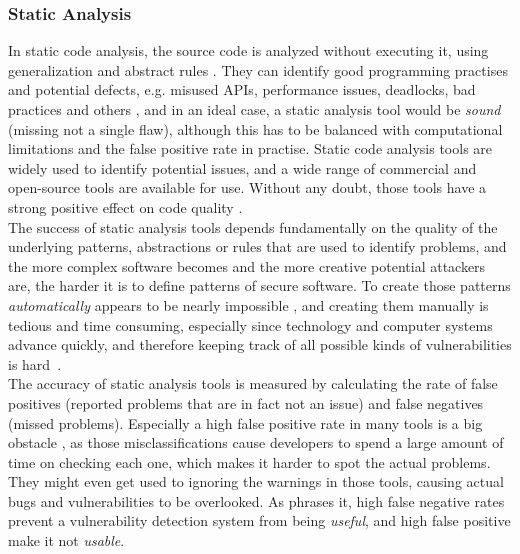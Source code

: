 \documentclass[
	a4paper,
	pagesize,
	pdftex,
	12pt,
	twoside, %
	BCOR=5mm, %
	ngerman,
	fleqn,
	final,
	]{scrartcl}
\begin{document}
\subsubsection{Static Analysis}
In static code analysis, the source code is analyzed without executing it, using generalization and abstract rules \cite{Ghaffarian.2017}. They can identify good programming practises and potential defects, e.g. misused APIs, performance issues, deadlocks, bad practices and others \cite{Venkatasubramanyam.2014}, and in an ideal case, a static analysis tool would be \textit{sound} (missing not a single flaw), although this has to be balanced with computational limitations and the false positive rate in practise. Static code analysis tools are widely used to identify potential issues, and a wide range of commercial and open-source tools are available for use. Without any doubt, those tools have a strong positive effect on code quality \cite{Liu.2018}. \\
The success of static analysis tools depends fundamentally on the quality of the underlying patterns, abstractions or rules that are used to identify problems, and the more complex software becomes and the more creative potential attackers are, the harder it is to define patterns of secure software. To create those patterns \textit{automatically} appears to be nearly impossible \cite{Rolim.2018, Yamaguchi.2012}, and creating them manually is tedious and time consuming, especially since technology and computer systems advance quickly, and therefore keeping track of all possible kinds of vulnerabilities is hard~\cite{Ma.2017}.\\
The accuracy of static analysis tools is measured by calculating the rate of false positives (reported problems that are in fact not an issue) and false negatives (missed problems). Especially a high false positive rate in many tools is a big obstacle \cite[S.~1]{Liu.2018}, as those misclassifications cause developers to spend a large amount of time on checking each one, which makes it harder to spot the actual problems. They might even get used to ignoring the warnings in those tools, causing actual bugs and vulnerabilities to be overlooked. As \cite{Li.2005} phrases it, high false negative rates prevent a vulnerability detection system from being \textit{useful}, and high false positive make it not \textit{usable}.\\
\end{document}
